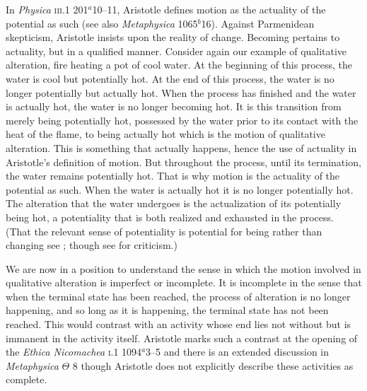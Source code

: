 In \emph{Physica} \textsc{iii}.1 201\( ^{a} \)10--11, Aristotle defines motion as the actuality of the potential as such (see also \emph{Metaphysica} 1065\( ^{b} \)16). Against Parmenidean skepticism, Aristotle insists upon the reality of change. Becoming pertains to actuality, but in a qualified manner. Consider again our example of qualitative alteration, fire heating a pot of cool water. At the beginning of this process, the water is cool but potentially hot. At the end of this process, the water is no longer potentially but actually hot. When the process has finished and the water is actually hot, the water is no longer becoming hot. It is this transition from merely being potentially hot, possessed by the water prior to its contact with the heat of the flame, to being actually hot which is the motion of qualitative alteration. This is something that actually happens, hence the use of actuality in Aristotle's definition of motion. But throughout the process, until its termination, the water remains potentially hot. That is why motion is the actuality of the potential as such. When the water is actually hot it is no longer potentially hot. The alteration that the water undergoes is the actualization of its potentially being hot, a potentiality that is both realized and exhausted in the process. (That the relevant sense of potentiality is potential for being rather than changing see \citealt{Kosman:1969aa}; though see \citealt{Heinaman:1994aa} for criticism.)

We are now in a position to understand the sense in which the motion involved in qualitative alteration is imperfect or incomplete. It is incomplete in the sense that when the terminal state has been reached, the process of alteration is no longer happening, and so long as it is happening, the terminal state has not been reached. This would contrast with an activity whose end lies not without but is immanent in the activity itself. Aristotle marks such a contrast at the opening of the \emph{Ethica Nicomachea} \textsc{i}.1 1094\( ^{a} \)3--5 and there is an extended discussion in \emph{Metaphysica} \( \Theta \) 8 though Aristotle does not explicitly describe these activities as complete.


